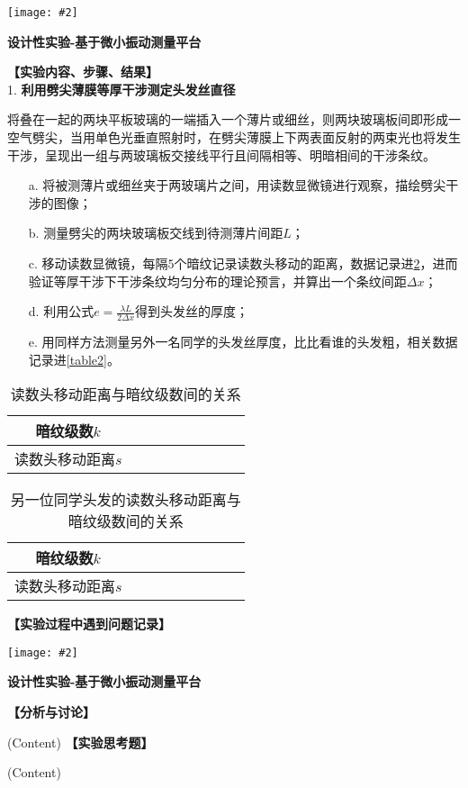 \documentclass[11pt,a4paper]{ctexart}
\newcommand{\ExpeName}{设计性实验-基于微小振动测量平台}
\newcommand{\cpic}[2]{
\begin{center}
\texttt{[image: \#2]}
\end{center}
}
\begin{document}
\newpage%
\cpic{0.255}{e2}%
\begin{center}
\LARGE{\textbf{\ExpeName}}
\end{center}
\textbf{【实验内容、步骤、结果】}
\\
1. \textbf{利用劈尖薄膜等厚干涉测定头发丝直径}\par
将叠在一起的两块平板玻璃的一端插入一个薄片或细丝，则两块玻璃板间即形成一空气劈尖，当用单色光垂直照射时，在劈尖薄膜上下两表面反射的两束光也将发生干涉，呈现出一组与两玻璃板交接线平行且间隔相等、明暗相间的干涉条纹。
\begin{enumerate}
\item[a.] 将被测薄片或细丝夹于两玻璃片之间，用读数显微镜进行观察，描绘劈尖干涉的图像；
\item[b.] 测量劈尖的两块玻璃板交线到待测薄片间距$L$；
\item[c.] 移动读数显微镜，每隔$5$个暗纹记录读数头移动的距离，数据记录进\cref{table1}，进而验证等厚干涉下干涉条纹均匀分布的理论预言，并算出一个条纹间距$\Delta x$；
\item[d.] 利用公式$e = \frac{\lambda L}{2 \Delta x}$得到头发丝的厚度；
\item[e.] 用同样方法测量另外一名同学的头发丝厚度，比比看谁的头发粗，相关数据记录进\cref{table2}。
\end{enumerate}
\begin{table}[H]
\centering
\caption{读数头移动距离与暗纹级数间的关系}
\label{table1}
\begin{tabular}{|c|p{10mm}|p{10mm}|p{10mm}|p{10mm}|p{10mm}|p{10mm}|p{10mm}|p{10mm}|}
\hline
暗纹级数$k$ &  &  &  &  &  &  &  &  \\ \hline
读数头移动距离$s$ &  &  &  &  &  &  &  &  \\ \hline
\end{tabular}
\end{table}
\begin{table}[H]
\centering
\caption{另一位同学头发的读数头移动距离与暗纹级数间的关系}
\label{table1}
\begin{tabular}{|c|p{10mm}|p{10mm}|p{10mm}|p{10mm}|p{10mm}|p{10mm}|p{10mm}|p{10mm}|}
\hline
暗纹级数$k$ &  &  &  &  &  &  &  &  \\ \hline
读数头移动距离$s$ &  &  &  &  &  &  &  &  \\ \hline
\end{tabular}
\end{table}


\textbf{【实验过程中遇到问题记录】}

%

\newpage%
\cpic{0.255}{e3}%
\begin{center}
\LARGE\textbf{{\ExpeName}}
\end{center}
\textbf{【分析与讨论】}\par
(Content)
\newline
\textbf{【实验思考题】}\par
(Content)
\end{document}
